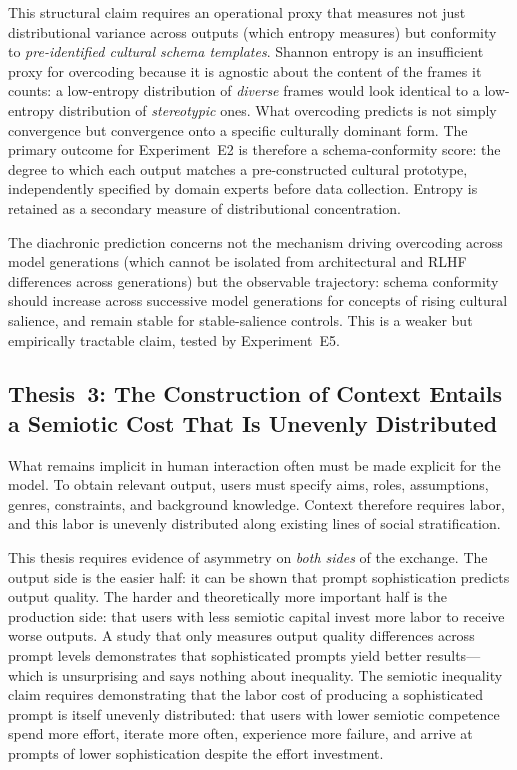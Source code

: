 \documentclass[12pt,a4paper]{article}
\begin{document}
This structural claim requires an operational proxy that measures not just
distributional variance across outputs (which entropy measures) but conformity
to \emph{pre-identified cultural schema templates}. Shannon entropy is an
insufficient proxy for overcoding because it is agnostic about the content
of the frames it counts: a low-entropy distribution of \emph{diverse} frames
would look identical to a low-entropy distribution of \emph{stereotypic} ones.
What overcoding predicts is not simply convergence but convergence onto a
specific culturally dominant form. The primary outcome for Experiment~E2 is
therefore a schema-conformity score: the degree to which each output matches
a pre-constructed cultural prototype, independently specified by domain
experts before data collection. Entropy is retained as a secondary measure
of distributional concentration.

The diachronic prediction concerns not the mechanism driving overcoding across
model generations (which cannot be isolated from architectural and RLHF
differences across generations) but the observable trajectory: schema
conformity should increase across successive model generations for concepts
of rising cultural salience, and remain stable for stable-salience controls.
This is a weaker but empirically tractable claim, tested by Experiment~E5.

\subsection{Thesis~3: The Construction of Context Entails a Semiotic Cost
That Is Unevenly Distributed}
\label{sec:thesis3}

What remains implicit in human interaction often must be made explicit for the
model. To obtain relevant output, users must specify aims, roles, assumptions,
genres, constraints, and background knowledge. Context therefore requires labor,
and this labor is unevenly distributed along existing lines of social
stratification.

This thesis requires evidence of asymmetry on \emph{both sides} of the
exchange. The output side is the easier half: it can be shown that prompt
sophistication predicts output quality. The harder and theoretically more
important half is the production side: that users with less semiotic capital
invest more labor to receive worse outputs. A study that only measures output
quality differences across prompt levels demonstrates that sophisticated
prompts yield better results---which is unsurprising and says nothing about
inequality. The semiotic inequality claim requires demonstrating that the
labor cost of producing a sophisticated prompt is itself unevenly distributed:
that users with lower semiotic competence spend more effort, iterate more
often, experience more failure, and arrive at prompts of lower sophistication
despite the effort investment.
\end{document}
